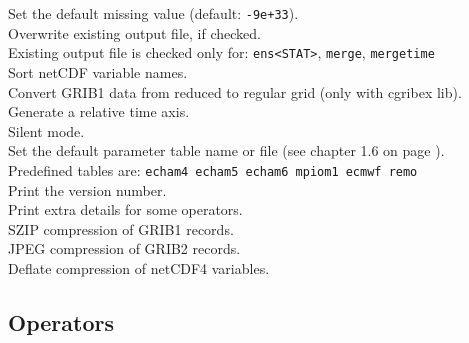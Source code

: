 \begin{tabbing}
         \> Set the default missing value (default: {\tt-9e+33}). \\
         \> Overwrite existing output file, if checked. \\
         \> Existing output file is checked only for: {\tt ens<STAT>}, {\tt merge}, {\tt mergetime} \\
         \> Sort netCDF variable names. \\
         \> Convert GRIB1 data from reduced to regular grid (only with cgribex lib). \\
         \> Generate a relative time axis. \\
         \> Silent mode. \\
         \> Set the default parameter table name or file (see chapter 1.6 on page \pageref{PARAMETER_TABLE}).\\
         \> Predefined tables are:  {\tt echam4 echam5 echam6 mpiom1 ecmwf remo}\\
         \> Print the version number. \\
         \> Print extra details for some operators. \\
         \> SZIP compression of GRIB1 records. \\
         \> JPEG compression of GRIB2 records. \\
         \> Deflate compression of netCDF4 variables. \\
\end{tabbing}

\subsection{Operators}

